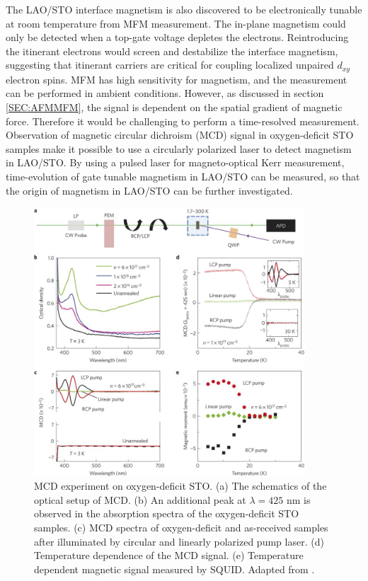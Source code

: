\documentclass[pdflatex, sectionletters, 12pt]{pittetd}    %
\begin{document}
The LAO/STO interface magnetism is also discovered to be electronically tunable at room temperature from MFM measurement\cite{bi2014room}. The in-plane magnetism could only be detected when a top-gate voltage depletes the electrons. Reintroducing the itinerant electrons would screen and destabilize the interface magnetism, suggesting that itinerant carriers are critical for coupling localized unpaired $d_{xy}$ electron spins\cite{fidkowski2013magnetic, Joshua2013gate, banerjee2013ferromagnetic}. MFM has high sensitivity for magnetism, and the measurement can be performed in ambient conditions. However, as discussed in section \ref{SEC:AFMMFM}, the signal is dependent on the spatial gradient of magnetic force. Therefore it would be challenging to perform a time-resolved measurement. Observation of magnetic circular dichroism (MCD) signal in oxygen-deficit STO samples\cite{rice2014persistent} make it possible to use a circularly polarized laser to detect magnetism in LAO/STO. By using a pulsed laser for magneto-optical Kerr measurement, time-evolution of gate tunable magnetism in LAO/STO can be measured, so that the origin of magnetism in LAO/STO can be further investigated.

\begin{figure}[p]
	\centering
	\includegraphics[width=0.9\textwidth]{Drawing/MCDRice.jpg}
	\caption{MCD experiment on oxygen-deficit STO. (a) The schematics of the optical setup of MCD. (b) An additional peak at $\lambda=425$ nm is observed in the absorption spectra of the oxygen-deficit STO samples. (c) MCD spectra of oxygen-deficit and as-received samples after illuminated by circular and linearly polarized pump laser. (d) Temperature dependence of the MCD signal. (e) Temperature dependent magnetic signal measured by SQUID. Adapted from \cite{rice2014persistent}.}
	\label{FIG:MCDRice}
\end{figure}
\end{document}
